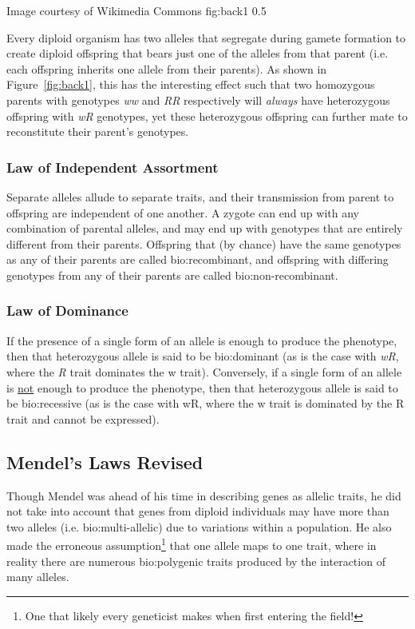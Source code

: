 	{Image courtesy of Wikimedia Commons}
	{fig:back1}
	{0.5}

Every diploid organism has two alleles that segregate during gamete formation to create diploid offspring that bears just one of the alleles from that parent (i.e. each offspring inherits one allele from their parents). As shown in Figure~\ref{fig:back1}, this has the interesting effect such that two homozygous parents with genotypes \textit{ww} and \textit{RR} respectively will \textit{always} have heterozygous offspring with \textit{wR} genotypes, yet these heterozygous offspring can further mate to reconstitute their parent's genotypes.


\subsubsection{Law of Independent Assortment}

Separate alleles allude to separate traits, and their transmission from parent to offspring are independent of one another. A zygote can end up with any combination of parental alleles, and may end up with genotypes that are entirely different from their parents. Offspring that (by chance) have the same genotypes as any of their parents are called \gls{bio:recombinant}, and offspring with differing genotypes from any of their parents are called \gls{bio:non-recombinant}.

\subsubsection{Law of Dominance}

If the presence of a single form of an allele is enough to produce the phenotype, then that heterozygous allele is said to be \gls{bio:dominant} (as is the case with \textit{wR}, where the \textit{R} trait dominates the w trait). Conversely, if a single form of an allele is \underline{not} enough to produce the phenotype, then that heterozygous allele is said to be \gls{bio:recessive} (as is the case with wR, where the w trait is dominated by the R trait and cannot be expressed).


\subsection{Mendel's Laws Revised}

Though Mendel was ahead of his time in describing genes as allelic traits, he did not take into account that genes from diploid individuals may have more than two alleles (i.e. \gls{bio:multi-allelic}) due to variations within a population.  He also made the erroneous assumption\footnote{One that likely every geneticist makes when first entering the field!} that one allele maps to one trait, where in reality there are numerous \gls{bio:polygenic traits} produced by the interaction of many alleles. 


